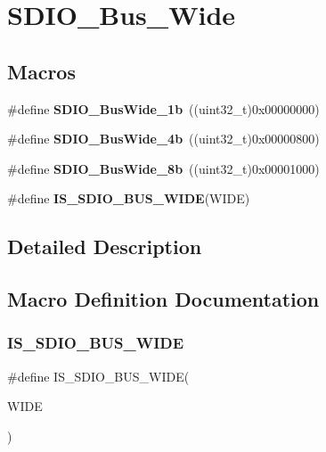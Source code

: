 \section{S\+D\+I\+O\+\_\+\+Bus\+\_\+\+Wide}
\label{group__SDIO__Bus__Wide}
\subsection*{Macros}
\begin{DoxyCompactItemize}
\item 
\#define \textbf{ S\+D\+I\+O\+\_\+\+Bus\+Wide\+\_\+1b}~((uint32\+\_\+t)0x00000000)
\item 
\#define \textbf{ S\+D\+I\+O\+\_\+\+Bus\+Wide\+\_\+4b}~((uint32\+\_\+t)0x00000800)
\item 
\#define \textbf{ S\+D\+I\+O\+\_\+\+Bus\+Wide\+\_\+8b}~((uint32\+\_\+t)0x00001000)
\item 
\#define \textbf{ I\+S\+\_\+\+S\+D\+I\+O\+\_\+\+B\+U\+S\+\_\+\+W\+I\+DE}(W\+I\+DE)
\end{DoxyCompactItemize}


\subsection{Detailed Description}


\subsection{Macro Definition Documentation}
\mbox{\label{group__SDIO__Bus__Wide_gaa5c6ad922117d5df3213631bf68fde5b}} 
\subsubsection{I\+S\+\_\+\+S\+D\+I\+O\+\_\+\+B\+U\+S\+\_\+\+W\+I\+DE}
{\footnotesize\ttfamily \#define I\+S\+\_\+\+S\+D\+I\+O\+\_\+\+B\+U\+S\+\_\+\+W\+I\+DE(\begin{DoxyParamCaption}\item[{}]{W\+I\+DE }\end{DoxyParamCaption})}

